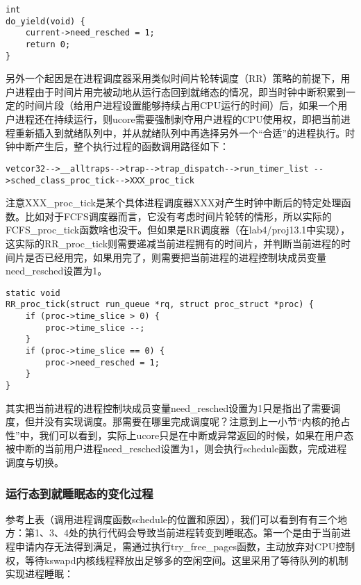 \begin{lstlisting}
int
do_yield(void) {
    current->need_resched = 1;
    return 0;
}
\end{lstlisting}

另外一个起因是在进程调度器采用类似时间片轮转调度（RR）策略的前提下，用户进程由于时间片用完被动地从运行态回到就绪态的情况，即当时钟中断积累到一定的时间片段（给用户进程设置能够持续占用CPU运行的时间）后，如果一个用户进程还在持续运行，则ucore需要强制剥夺用户进程的CPU使用权，即把当前进程重新插入到就绪队列中，并从就绪队列中再选择另外一个``合适''的进程执行。时钟中断产生后，整个执行过程的函数调用路径如下：

\begin{lstlisting}
vetcor32-->__alltraps-->trap-->trap_dispatch-->run_timer_list -->sched_class_proc_tick-->XXX_proc_tick
\end{lstlisting}

注意XXX\_proc\_tick是某个具体进程调度器XXX对产生时钟中断后的特定处理函数。比如对于FCFS调度器而言，它没有考虑时间片轮转的情形，所以实际的FCFS\_proc\_tick函数啥也没干。但如果是RR调度器（在lab4/proj13.1中实现），这实际的RR\_proc\_tick则需要递减当前进程拥有的时间片，并判断当前进程的时间片是否已经用完，如果用完了，则需要把当前进程的进程控制块成员变量need\_resched设置为1。

\begin{lstlisting}
static void
RR_proc_tick(struct run_queue *rq, struct proc_struct *proc) {
    if (proc->time_slice > 0) {
        proc->time_slice --;
    }
    if (proc->time_slice == 0) {
        proc->need_resched = 1;
    }
}
\end{lstlisting}

其实把当前进程的进程控制块成员变量need\_resched设置为1只是指出了需要调度，但并没有实现调度。那需要在哪里完成调度呢？注意到上一小节``内核的抢占性''中，我们可以看到，实际上ucore只是在中断或异常返回的时候，如果在用户态被中断的当前用户进程need\_resched设置为1，则会执行schedule函数，完成进程调度与切换。

\subsubsection{运行态到就睡眠态的变化过程}\label{ux8fd0ux884cux6001ux5230ux5c31ux7761ux7720ux6001ux7684ux53d8ux5316ux8fc7ux7a0b}

参考上表（调用进程调度函数schedule的位置和原因），我们可以看到有有三个地方：第1、3、4处的执行代码会导致当前进程转变到睡眠态。第一个是由于当前进程申请内存无法得到满足，需通过执行try\_free\_pages函数，主动放弃对CPU控制权，等待kswapd内核线程释放出足够多的空闲空间。这里采用了等待队列的机制实现进程睡眠：

